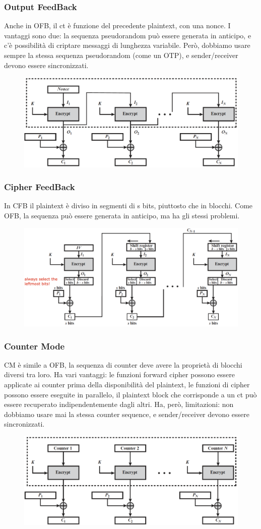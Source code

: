 \documentclass[11pt]{article}
\begin{document}
\subsubsection{Output FeedBack}
Anche in OFB, il ct è funzione del precedente plaintext, con una nonce. I vantaggi sono due: la sequenza pseudorandom può essere generata in anticipo, e c'è possibilità di criptare messaggi di lunghezza variabile. Però, dobbiamo usare sempre la stessa sequenza pseudorandom (come un OTP), e sender/receiver devono essere sincronizzati. 
\begin{figure}[H]
    \centering
    \includegraphics[width=0.6\linewidth]{res/crypto/OFB.png}
\end{figure}
\subsubsection{Cipher FeedBack}
In CFB il plaintext è diviso in segmenti di s bits, piuttosto che in blocchi. Come OFB, la sequenza può essere generata in anticipo, ma ha gli stessi problemi. 
\begin{figure}[H]
    \centering
    \includegraphics[width=0.6\linewidth]{res/crypto/CFB.png}
\end{figure}
\subsubsection{Counter Mode}
CM è simile a OFB, la sequenza di counter deve avere la proprietà di blocchi diversi tra loro. Ha vari vantaggi: le funzioni forward cipher possono essere applicate ai counter prima della disponibilità del plaintext, le funzioni di cipher possono essere eseguite in parallelo, il plaintext block che corrisponde a un ct può essere recuperato indipendentemente dagli altri. Ha, però, limitazioni: non dobbiamo usare mai la stessa counter sequence, e sender/receiver devono essere sincronizzati.
\begin{figure}[H]
    \centering
    \includegraphics[width=0.6\linewidth]{res/crypto/CM.png}
\end{figure}
\end{document}
